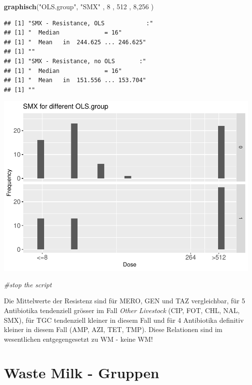 \documentclass[
]{article}
\newenvironment{Shaded}{\begin{snugshade}}{\end{snugshade}}
\newcommand{\CommentTok}[1]{\textcolor[rgb]{0.56,0.35,0.01}{\textit{#1}}}
\newcommand{\DecValTok}[1]{\textcolor[rgb]{0.00,0.00,0.81}{#1}}
\newcommand{\KeywordTok}[1]{\textcolor[rgb]{0.13,0.29,0.53}{\textbf{#1}}}
\newcommand{\NormalTok}[1]{#1}
\newcommand{\StringTok}[1]{\textcolor[rgb]{0.31,0.60,0.02}{#1}}
\begin{document}
\begin{Shaded}
\begin{Highlighting}[]
  \KeywordTok{graphisch}\NormalTok{(}\StringTok{"OLS.group"}\NormalTok{, }\StringTok{"SMX"}\NormalTok{ , }\DecValTok{8}\NormalTok{    , }\DecValTok{512}\NormalTok{   ,   }\DecValTok{8}\NormalTok{,}\DecValTok{256}\NormalTok{   ) }
\end{Highlighting}
\end{Shaded}

\begin{verbatim}
## [1] "SMX - Resistance, OLS            :"
## [1] "  Median             = 16"
## [1] "  Mean   in  244.625 ... 246.625"
## [1] ""
## [1] "SMX - Resistance, no OLS       :"
## [1] "  Median             = 16"
## [1] "  Mean   in  151.556 ... 153.704"
## [1] ""
\end{verbatim}

\includegraphics{Verteilungen_files/figure-latex/unnamed-chunk-30-1.pdf}

\begin{Shaded}
\begin{Highlighting}[]
  \CommentTok{#stop the script}
\end{Highlighting}
\end{Shaded}

Die Mittelwerte der Resistenz sind für MERO, GEN und TAZ vergleichbar,
für 5 Antibiotika tendenziell grösser im Fall \emph{Other Livestock}
(CIP, FOT, CHL, NAL, SMX), für TGC tendenziell kleiner in diesem Fall
und für 4 Antibiotika definitiv kleiner in diesem Fall (AMP, AZI, TET,
TMP). Diese Relationen sind im wesentlichen entgegengesetzt zu WM -
keine WM!

\hypertarget{waste-milk---gruppen}{%
\section{Waste Milk - Gruppen}\label{waste-milk---gruppen}}
\end{document}
